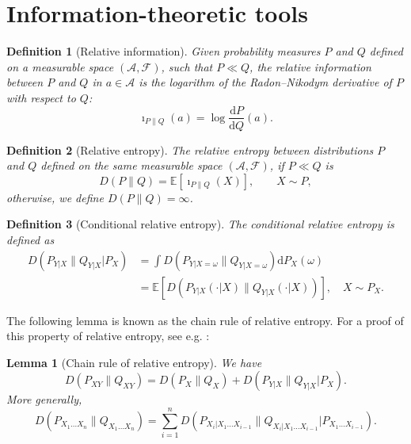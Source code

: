 \documentclass{article}
\newtheorem{definition}{Definition}
\newtheorem{lemma}{Lemma}
\newcommand{\E}{\mathbb{E}}
\begin{document}
\section{Information-theoretic tools}\label{info theory tools}
\begin{definition}[Relative information] Given probability measures $P$ and $Q$ defined on a measurable space $(\mathcal{A},\mathscr{F})$, such that $P\ll Q$, the relative information between $P$ and $Q$ in $a\in \mathcal{A}$ is the logarithm of the Radon--Nikodym derivative of $P$ with respect to $Q$:
\begin{equation}\nonumber
	\imath_{P\|Q}(a)=\log \frac{\mathrm{d}P}{\mathrm{d}Q}(a).
\end{equation}
\end{definition}
\begin{definition}[Relative entropy] The relative entropy between distributions $P$ and $Q$ defined on the same measurable space $(\mathcal{A}, \mathscr{F})$, if $P\ll Q$ is 
\begin{equation}\nonumber
	D(P\|Q)=\mathbb{E}[\imath_{P\|Q}(X)], \qquad X\sim P,
\end{equation}
otherwise, we define $D(P\|Q)=\infty$.
\end{definition}
\begin{definition}[Conditional relative entropy] The conditional relative entropy is defined as 
\begin{align}
	D(P_{Y|X}\|Q_{Y|X}|P_X)&=\int D(P_{Y|X=\omega}\|Q_{Y|X=\omega})\mathrm{d}P_X(\omega)\nonumber\\
						   &=\E[D(P_{Y|X}(\cdot|X)\|Q_{Y|X}(\cdot|X))], \quad X\sim P_X. \nonumber
\end{align}
\end{definition}

The following lemma is known as the chain rule of relative entropy. For a proof of this property of relative entropy, see e.g. \cite[Theorem 2.5.3]{Cover}:
\begin{lemma}[Chain rule of relative entropy]\label{chain rule lemma} We have
\begin{equation}
	D(P_{XY}\|Q_{XY})=D(P_X\|Q_X)+D(P_{Y|X}\|Q_{Y|X}|P_X). \nonumber
\end{equation}
More generally,
\begin{equation}
	D\left(P_{X_1\dots X_n}\|Q_{X_1\dots X_n}\right)=\sum_{i=1}^n D\left(P_{X_i|X_1\dots X_{i-1}}\|Q_{X_i|X_1\dots X_{i-1}}|P_{X_1\dots X_{i-1}}\right). \nonumber
\end{equation}
\end{lemma}
\end{document}
